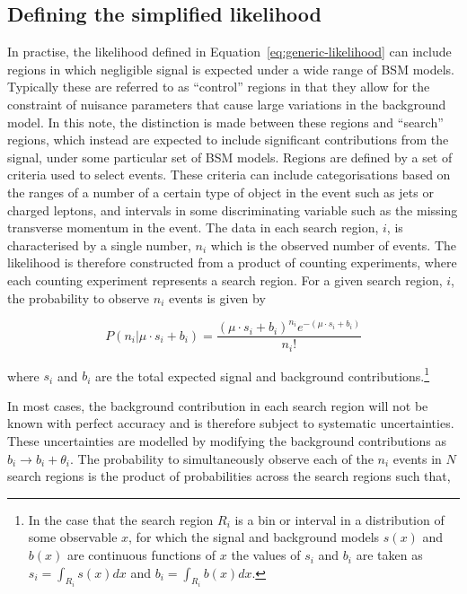 \subsection{Defining the simplified likelihood}
In practise, the likelihood defined in Equation~\ref{eq:generic-likelihood} can include regions in which negligible signal is expected under a wide 
range of BSM models. Typically these are referred to as ``control'' regions in that they allow for the constraint of nuisance parameters that  
cause large variations in the background model.
In this note, the distinction is made between these regions and ``search'' regions, which instead 
are expected to include significant contributions from the signal, under some particular set of BSM models. Regions
are defined by a set of criteria used to select events. These criteria can include categorisations based on 
the ranges of a number of a certain type of object in the event such as jets or 
charged leptons, and intervals in some discriminating variable such as the missing transverse momentum in the event. The data in each search region, $i$, is characterised 
by a single number, $n_{i}$ which is the observed number of events. The likelihood is therefore constructed from a product of counting 
experiments, where each counting experiment represents a search region. 
For a given search region, $i$, the probability to observe $n_{i}$ events is given by

\begin{equation}
 P(n_{i}|\mu \cdot s_{i}+b_{i}) = \dfrac{(\mu \cdot s_{i}+b_{i})^{n_{i}} e^{-(\mu \cdot s_{i}+b_{i})} }{n_{i}!}
\label{eq:poisson-likelihood}
\end{equation}

where $s_{i}$ and $b_{i}$ are the total expected signal and background contributions.\footnote{In the case 
that the search region $R_{i}$ is a bin or interval in a distribution of some observable $x$, for which the signal and background models $s(x)$ 
and $b(x)$ are continuous functions of $x$ the values of $s_{i}$ and $b_{i}$ are taken as 
$s_{i}=\int_{R_{i}} s(x)dx$ and $b_{i}=\int_{R_{i}} b(x)dx$.}

In most cases, the background contribution in each search region will not be known with perfect accuracy and is therefore 
subject to systematic uncertainties. These uncertainties are modelled by modifying the background contributions as 
$b_{i}\rightarrow b_{i}+\theta_{i}$. 
The probability to simultaneously observe each of the $n_{i}$ events in $N$ search regions is the product of probabilities across the search regions such that,

